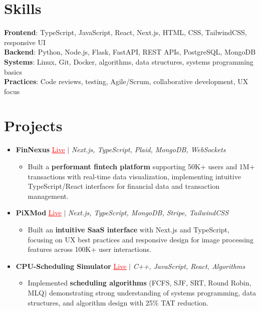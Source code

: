 \documentclass[letterpaper,10pt]{article}
\newcommand{\resumeItem}[1]{\item\small{{#1 \vspace{-2pt}}}}
\newcommand{\resumeProjectHeading}[1]{\item \small #1 \vspace{-2pt}}
\newcommand{\resumeSubHeadingListStart}{\begin{itemize}[leftmargin=0.0in, label={}]}
\newcommand{\resumeSubHeadingListEnd}{\end{itemize}}
\newcommand{\resumeProjItemListStart}{\begin{itemize}[leftmargin=0.15in,label=\textbullet,itemsep=0pt,topsep=0pt,parsep=0pt,partopsep=0pt]}
\newcommand{\resumeProjItemListEnd}{\end{itemize}\vspace{-4pt}}
\begin{document}
\section{Skills}
\begin{itemize}[leftmargin=0.15in, label={}]
\small{\item{
\textbf{Frontend}: TypeScript, JavaScript, React, Next.js, HTML, CSS, TailwindCSS, responsive UI \\
\textbf{Backend}: Python, Node.js, Flask, FastAPI, REST APIs, PostgreSQL, MongoDB \\
\textbf{Systems}: Linux, Git, Docker, algorithms, data structures, systems programming basics \\
\textbf{Practices}: Code reviews, testing, Agile/Scrum, collaborative development, UX focus
}}
\end{itemize}
\vspace{-16pt}
\section{Projects}
\resumeSubHeadingListStart
\vspace{-2pt}
\resumeProjectHeading{\textbf{FinNexus} {\href{https://fin-nexus.vercel.app/}{\textcolor{red}{\underline{Live}}}} $|$ \emph{Next.js, TypeScript, Plaid, MongoDB, WebSockets}}
\resumeProjItemListStart
\resumeItem{Built a \textbf{performant fintech platform} supporting 50K+ users and 1M+ transactions with real-time data visualization, implementing intuitive TypeScript/React interfaces for financial data and transaction management.}
\resumeProjItemListEnd
\vspace{3pt}
\resumeProjectHeading{\textbf{PiXMod} {\href{https://pixmod.vercel.app/}{\textcolor{red}{\underline{Live}}}} $|$ \emph{Next.js, TypeScript, MongoDB, Stripe, TailwindCSS}}
\resumeProjItemListStart
\resumeItem{Built an \textbf{intuitive SaaS interface} with Next.js and TypeScript, focusing on UX best practices and responsive design for image processing features across 100K+ user interactions.}
\resumeProjItemListEnd
\vspace{3pt}
\resumeProjectHeading{\textbf{CPU-Scheduling Simulator} {\href{https://cpu-scheduler-amber.vercel.app/}{\textcolor{red}{\underline{Live}}}} $|$ \emph{C++, JavaScript, React, Algorithms}}
\resumeProjItemListStart
\resumeItem{Implemented \textbf{scheduling algorithms} (FCFS, SJF, SRT, Round Robin, MLQ) demonstrating strong understanding of systems programming, data structures, and algorithm design with 25\% TAT reduction.}
\resumeProjItemListEnd
\resumeSubHeadingListEnd
\end{document}
